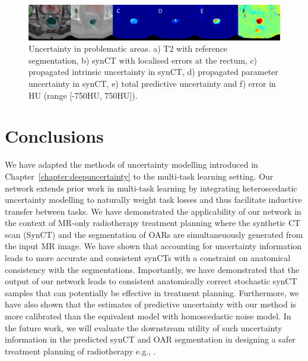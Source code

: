 \begin{figure}[!t]
	\centering
	\includegraphics[width=\linewidth]{chapter_5/figures/new_qa.pdf}
	\caption{\footnotesize Uncertainty in problematic areas. a) T2 with reference segmentation, b) synCT with localised errors at the rectum, c) propagated intrinsic uncertainty in synCT, d) propagated parameter uncertainty in synCT, e) total predictive uncertainty and f) error in HU (range [-750HU, 750HU]).} 
	\label{fig:diagram4}
\end{figure}

\section{Conclusions}
%
%
We have adapted the methods of uncertainty modelling introduced in Chapter~\ref{chapter:deepuncertainty} to the multi-task learning setting. Our network extends prior work in multi-task learning by integrating heteroscedastic uncertainty modelling to naturally weight task losses and thus facilitate inductive transfer between tasks. We have demonstrated the applicability of our network in the context of MR-only radiotherapy treatment planning where the synthetic CT scan (SynCT) and the segmentation of OARs are simultaneuously generated from the input MR image. We have shown that accounting for uncertainty information leads to more accurate and consistent synCTs with a constraint on anatomical consistency with the segmentations. Importantly, we have demonstrated that the output of our network leads to consistent anatomically correct stochastic synCT samples that can potentially be effective in treatment planning. Furthermore, we have also shown that the estimates of predictive uncertainty with our method is more calibrated than the equivalent model with homoscedastic noise model. In the future work, we will evaluate the downstream utility of such uncertainty information in the predicted synCT and OAR segmentation in designing a safer treatment planning of radiotherapy e.g., \cite{sands2015utilisation,tilly2019probabilistic}.
 




